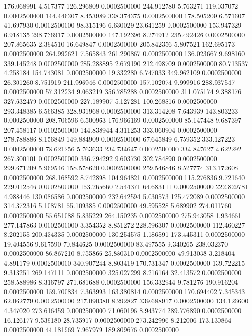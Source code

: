 176.068991 4.507377 126.296809 0.0002500000
244.912780 5.763271 119.037072 0.0002500000
144.446307 8.453989 338.374375 0.0002500000
178.505209 6.571607 41.697930 0.0002500000
98.315196 6.630029 23.641259 0.0002500000
153.947329 6.918135 298.736917 0.0002500000
147.192396 8.274912 235.492426 0.0002500000
207.865635 2.394510 16.649847 0.0002500000
205.842356 5.807521 162.695173 0.0002500000
264.992621 7.565843 261.290867 0.0002500000
136.023667 9.698160 339.145248 0.0002500000
285.288895 2.679190 212.498709 0.0002500000
80.713537 4.258184 154.743081 0.0002500000
19.332280 6.747033 349.962109 0.0002500000
26.301260 8.751919 241.996946 0.0002500000
157.102074 9.999916 288.937547 0.0002500000
57.312234 9.063219 356.785288 0.0002500000
311.075174 9.388176 327.632479 0.0002500000
227.189907 5.127281 100.268816 0.0002500000
293.348385 6.566385 328.931968 0.0002500000
313.314208 7.643939 143.803233 0.0002500000
208.706596 6.500963 176.966169 0.0002500000
85.147448 9.687397 207.458117 0.0002500000
144.838944 4.311253 333.060904 0.0002500000
278.788886 8.156849 149.884909 0.0002500000
67.645849 6.759352 333.127223 0.0002500000
78.621256 5.763633 234.734647 0.0002500000
334.847627 4.622292 267.300101 0.0002500000
336.794292 9.603730 302.784890 0.0002500000
299.671209 5.969546 158.578620 0.0002500000
259.546846 8.527774 313.172608 0.0002500000
268.168592 8.742898 104.964821 0.0002500000
115.276836 9.721640 229.012546 0.0002500000
163.265660 2.544371 64.683111 0.0002500000
222.829781 4.988446 130.086586 0.0002500000
232.642594 5.030573 125.472089 0.0002500000
314.372316 5.108781 65.109385 0.0002500000
49.595528 5.689902 274.011760 0.0002500000
55.651088 5.835229 264.150235 0.0002500000
275.943058 1.934661 277.147863 0.0002500000
3.354352 8.851272 228.596307 0.0002500000
112.460227 8.202155 200.434335 0.0002500000
130.254575 1.186591 173.445311 0.0002500000
19.404556 9.617590 70.844625 0.0002500000
83.497555 9.340265 238.032370 0.0002500000
86.867210 8.755866 25.880310 0.0002500000
49.913038 3.218404 4.891179 0.0002500000
340.907244 8.803419 170.731347 0.0002500000
139.722215 9.313251 269.147111 0.0002500000
325.027299 8.216164 32.413572 0.0002500000
258.588986 8.316797 271.681688 0.0002500000
156.332944 9.781276 190.916204 0.0002500000
159.700834 7.363993 163.380814 0.0002500000
170.694402 7.345343 62.062779 0.0002500000
217.090380 8.292827 339.688917 0.0002500000
134.126600 4.347020 273.616459 0.0002500000
71.060196 8.943774 289.776890 0.0002500000
16.126177 9.539180 28.735917 0.0002500000
273.242996 8.212006 173.130864 0.0002500000
44.181969 7.967979 189.809676 0.0002500000
